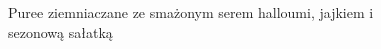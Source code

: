 \documentclass[a4paper,10pt]{book}
\begin{document}
\begin{figure}[H]
    \centering
    \begin{minipage}{0.4\textwidth}
        \centering
        \caption{Puree ziemniaczane ze smażonym serem halloumi, jajkiem i sezonową sałatką}
    \end{minipage}
    \hspace{0.05\textwidth}
    \begin{minipage}{0.4\textwidth}
        \centering

\end{minipage}
\end{figure}
\end{document}
